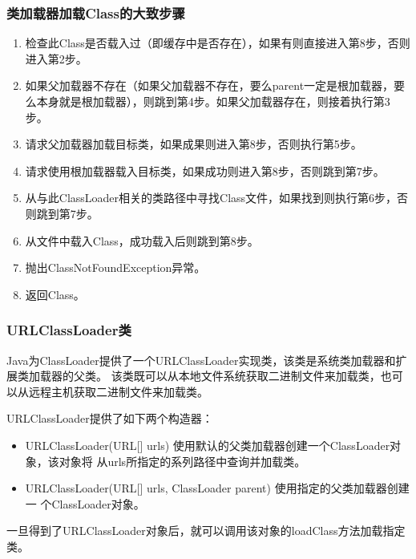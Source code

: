 \begin{frame}[fragile] %
\frametitle{类加载器加载Class的大致步骤}
\begin{enumerate}\kai
\item 检查此Class是否载入过（即缓存中是否存在），如果有则直接进入第8步，否则进入第2步。
\item 如果父加载器不存在（如果父加载器不存在，要么parent一定是根加载器，要么本身就是根加载器），则跳到第4步。如果父加载器存在，则接着执行第3步。
\item 请求父加载器加载目标类，如果成果则进入第8步，否则执行第5步。
\item 请求使用根加载器载入目标类，如果成功则进入第8步，否则跳到第7步。
\item 从与此ClassLoader相关的类路径中寻找Class文件，如果找到则执行第6步，否则跳到第7步。
\item 从文件中载入Class，成功载入后则跳到第8步。
\item 抛出ClassNotFoundException异常。
\item 返回Class。
\end{enumerate}
\end{frame}

\begin{frame}[fragile] %
\frametitle{URLClassLoader类}
Java为ClassLoader提供了一个URLClassLoader实现类，该类是系统类加载器和扩展类加载器的父类。
该类既可以从本地文件系统获取二进制文件来加载类，也可以从远程主机获取二进制文件来加载类。

URLClassLoader提供了如下两个构造器：

\begin{itemize}
\item URLClassLoader(URL[] urls) 使用默认的父类加载器创建一个ClassLoader对象，该对象将
  从urls所指定的系列路径中查询并加载类。
\item URLClassLoader(URL[] urls, ClassLoader parent) 使用指定的父类加载器创建一
  个ClassLoader对象。
\end{itemize}
一旦得到了URLClassLoader对象后，就可以调用该对象的loadClass方法加载指定类。
\end{frame}

